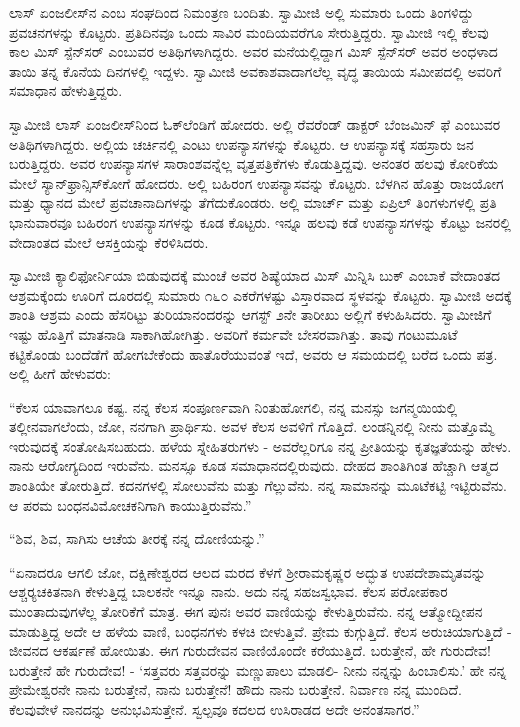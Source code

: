  ಲಾಸ್ ಏಂಜಲೀಸ್‍ನ  ಎಂಬ ಸಂಘದಿಂದ ನಿಮಂತ್ರಣ ಬಂದಿತು. ಸ್ವಾಮೀಜಿ ಅಲ್ಲಿ ಸುಮಾರು ಒಂದು ತಿಂಗಳಿದ್ದು ಪ್ರವಚನಗಳನ್ನು ಕೊಟ್ಟರು. ಪ್ರತಿದಿನವೂ ಒಂದು ಸಾವಿರ ಮಂದಿಯವರೆಗೂ ಸೇರುತ್ತಿದ್ದರು. ಸ್ವಾಮೀಜಿ ಇಲ್ಲಿ ಕೆಲವು ಕಾಲ ಮಿಸ್ ಸ್ಪೆನ್‍ಸರ್ ಎಂಬುವರ ಅತಿಥಿಗಳಾಗಿದ್ದರು. ಅವರ ಮನೆಯಲ್ಲಿದ್ದಾಗ ಮಿಸ್ ಸ್ಪೆನ್‍ಸರ್ ಅವರ ಅಂಧಳಾದ ತಾಯಿ ತನ್ನ ಕೊನೆಯ ದಿನಗಳಲ್ಲಿ ಇದ್ದಳು. ಸ್ವಾಮೀಜಿ ಅವಕಾಶವಾದಾಗಲೆಲ್ಲ ವೃದ್ಧ ತಾಯಿಯ ಸಮೀಪದಲ್ಲಿ ಅವರಿಗೆ ಸಮಾಧಾನ ಹೇಳುತ್ತಿದ್ದರು. 

 ಸ್ವಾಮೀಜಿ ಲಾಸ್ ಏಂಜಲೀಸ್‍ನಿಂದ ಓಕ್‍ಲೆಂಡಿಗೆ ಹೋದರು. ಅಲ್ಲಿ ರೆವರೆಂಡ್ ಡಾಕ್ಟರ್ ಬೆಂಜಮಿನ್ ಫೆ ಎಂಬುವರ ಅತಿಥಿಗಳಾಗಿದ್ದರು. ಅಲ್ಲಿಯ ಚರ್ಚಿನಲ್ಲಿ ಎಂಟು ಉಪನ್ಯಾಸಗಳನ್ನು ಕೊಟ್ಟರು. ಆ ಉಪನ್ಯಾಸಕ್ಕೆ ಸಹಸ್ರಾರು ಜನ ಬರುತ್ತಿದ್ದರು. ಅವರ ಉಪನ್ಯಾಸಗಳ ಸಾರಾಂಶವನ್ನೆಲ್ಲ ವೃತ್ತಪತ್ರಿಕೆಗಳು ಕೊಡುತ್ತಿದ್ದವು. ಅನಂತರ ಹಲವು ಕೋರಿಕೆಯ ಮೇಲೆ ಸ್ಯಾನ್‍ಫ್ರಾನ್ಸಿಸ್‍ಕೋಗೆ ಹೋದರು. ಅಲ್ಲಿ ಬಹಿರಂಗ ಉಪನ್ಯಾಸವನ್ನು ಕೊಟ್ಟರು. ಬೆಳಗಿನ ಹೊತ್ತು ರಾಜಯೋಗ ಮತ್ತು ಧ್ಯಾನದ ಮೇಲೆ ಪ್ರವಚಾನಾದಿಗಳನ್ನು ತೆಗೆದುಕೊಂಡರು. ಅಲ್ಲಿ ಮಾರ್ಚ್ ಮತ್ತು ಏಪ್ರಿಲ್ ತಿಂಗಳುಗಳಲ್ಲಿ ಪ್ರತಿ ಭಾನುವಾರವೂ ಬಹಿರಂಗ ಉಪನ್ಯಾಸಗಳನ್ನು ಕೂಡ ಕೊಟ್ಟರು. ಇನ್ನೂ ಹಲವು ಕಡೆ ಉಪನ್ಯಾಸಗಳನ್ನು ಕೊಟ್ಟು ಜನರಲ್ಲಿ ವೇದಾಂತದ ಮೇಲೆ ಆಸಕ್ತಿಯನ್ನು ಕೆರಳಿಸಿದರು. 

 ಸ್ವಾಮೀಜಿ ಕ್ಯಾಲಿಫೋರ್ನಿಯಾ ಬಿಡುವುದಕ್ಕೆ ಮುಂಚೆ ಅವರ ಶಿಷ್ಯೆಯಾದ ಮಿಸ್ ಮಿನ್ನಿಸಿ ಬುಕ್ ಎಂಬಾಕೆ ವೇದಾಂತದ ಆಶ್ರಮಕ್ಕೆಂದು ಊರಿಗೆ ದೂರದಲ್ಲಿ ಸುಮಾರು ೧೬೦ ಎಕರೆಗಳಷ್ಟು ವಿಸ್ತಾರವಾದ ಸ್ಥಳವನ್ನು ಕೊಟ್ಟರು. ಸ್ವಾಮೀಜಿ ಅದಕ್ಕೆ ಶಾಂತಿ ಆಶ್ರಮ ಎಂದು ಹೆಸರಿಟ್ಟು ತುರಿಯಾನಂದರನ್ನು ಆಗಸ್ಟ್ ೨ನೇ ತಾರೀಖು ಅಲ್ಲಿಗೆ ಕಳುಹಿಸಿದರು. ಸ್ವಾಮೀಜಿಗೆ ಇಷ್ಟು ಹೊತ್ತಿಗೆ ಮಾತನಾಡಿ ಸಾಕಾಗಿಹೋಗಿತ್ತು. ಅವರಿಗೆ ಕರ್ಮವೇ ಬೇಸರವಾಗಿತ್ತು. ತಾವು ಗಂಟುಮೂಟೆ ಕಟ್ಟಿಕೊಂಡು ಬಂದೆಡೆಗೆ ಹೋಗಬೇಕೆಂದು ಹಾತೊರೆಯುವಂತೆ ಇದೆ, ಅವರು ಆ ಸಮಯದಲ್ಲಿ ಬರೆದ ಒಂದು ಪತ್ರ. ಅಲ್ಲಿ ಹೀಗೆ ಹೇಳುವರು: 

 “ಕೆಲಸ ಯಾವಾಗಲೂ ಕಷ್ಟ. ನನ್ನ ಕೆಲಸ ಸಂಪೂರ್ಣವಾಗಿ ನಿಂತುಹೋಗಲಿ, ನನ್ನ ಮನಸ್ಸು ಜಗನ್ಮಯಿಯಲ್ಲಿ ತಲ್ಲೀನವಾಗಲೆಂದು, ಜೋ, ನನಗಾಗಿ ಪ್ರಾರ್ಥಿಸು. ಅವಳ ಕೆಲಸ ಅವಳಿಗೆ ಗೊತ್ತಿದೆ. ಲಂಡನ್ನಿನಲ್ಲಿ ನೀನು ಮತ್ತೊಮ್ಮೆ ಇರುವುದಕ್ಕೆ ಸಂತೋಷಿಸಬಹುದು. ಹಳೆಯ ಸ್ನೇಹಿತರುಗಳು - ಅವರೆಲ್ಲರಿಗೂ ನನ್ನ ಪ್ರೀತಿಯನ್ನು ಕೃತಜ್ಞತೆಯನ್ನು ಹೇಳು. ನಾನು ಆರೋಗ್ಯದಿಂದ ಇರುವೆನು. ಮನಸ್ಸೂ ಕೂಡ ಸಮಾಧಾನದಲ್ಲಿರುವುದು. ದೇಹದ ಶಾಂತಿಗಿಂತ ಹೆಚ್ಚಾಗಿ ಆತ್ಮದ ಶಾಂತಿಯೇ ತೋರುತ್ತಿದೆ. ಕದನಗಳಲ್ಲಿ ಸೋಲುವೆನು ಮತ್ತು ಗೆಲ್ಲುವೆನು. ನನ್ನ ಸಾಮಾನನ್ನು ಮೂಟೆಕಟ್ಟಿ ಇಟ್ಟಿರುವೆನು. ಆ ಪರಮ ಬಂಧನವಿಮೋಚಕನಿಗಾಗಿ ಕಾಯುತ್ತಿರುವೆನು.” 

 “ಶಿವ, ಶಿವ, ಸಾಗಿಸು ಆಚೆಯ ತೀರಕ್ಕೆ ನನ್ನ ದೋಣಿಯನ್ನು.” 

 “ಏನಾದರೂ ಆಗಲಿ ಜೋ, ದಕ್ಷಿಣೇಶ್ವರದ ಆಲದ ಮರದ ಕೆಳಗೆ ಶ‍್ರೀರಾಮಕೃಷ್ಣರ ಅದ್ಭುತ ಉಪದೇಶಾಮೃತವನ್ನು ಆಶ್ಚರ‍್ಯಚಕಿತನಾಗಿ ಕೇಳುತ್ತಿದ್ದ ಬಾಲಕನೇ ಇನ್ನೂ ನಾನು. ಅದು ನನ್ನ ಸಹಜಸ್ವಭಾವ. ಕೆಲಸ ಪರೋಪಕಾರ ಮುಂತಾದುವುಗಳೆಲ್ಲ ತೋರಿಕೆಗೆ ಮಾತ್ರ. ಈಗ ಪುನಃ ಅವರ ವಾಣಿಯನ್ನು ಕೇಳುತ್ತಿರುವೆನು. ನನ್ನ ಆತ್ಮೋದ್ದೀಪನ ಮಾಡುತ್ತಿದ್ದ ಅದೇ ಆ ಹಳೆಯ ವಾಣಿ, ಬಂಧನಗಳು ಕಳಚಿ ಬೀಳುತ್ತಿವೆ. ಪ್ರೇಮ ಕುಗ್ಗುತ್ತಿದೆ. ಕೆಲಸ ಅರುಚಿಯಾಗುತ್ತಿದೆ - ಜೀವನದ ಆಕರ್ಷಣೆ ಹೋಯಿತು. ಈಗ ಗುರುದೇವನ ವಾಣಿಯೊಂದೇ ಕರೆಯುತ್ತಿದೆ. ಬರುತ್ತೇನೆ, ಹೇ ಗುರುದೇವ! ಬರುತ್ತೇನೆ ಹೇ ಗುರುದೇವ! - ‘ಸತ್ತವರು ಸತ್ತವರನ್ನು ಮಣ್ಣುಪಾಲು ಮಾಡಲಿ- ನೀನು ನನ್ನನ್ನು ಹಿಂಬಾಲಿಸು.’ ಹೇ ನನ್ನ ಪ್ರೇಮೇಶ್ವರನೇ ನಾನು ಬರುತ್ತೇನೆ, ನಾನು ಬರುತ್ತೇನೆ! ಹೌದು ನಾನು ಬರುತ್ತೇನೆ. ನಿರ್ವಾಣ ನನ್ನ ಮುಂದಿದೆ. ಕೆಲವುವೇಳೆ ನಾನದನ್ನು ಅನುಭವಿಸುತ್ತೇನೆ. ಸ್ವಲ್ಪವೂ ಕದಲದ ಉಸಿರಾಡದ ಅದೇ ಅನಂತಸಾಗರ.” 

